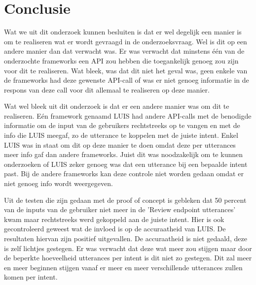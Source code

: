
\chapter{Conclusie}
\label{ch:conclusie}


Wat we uit dit onderzoek kunnen besluiten is dat er wel degelijk een manier is om te realiseren wat er wordt gevraagd in de onderzoeksvraag. Wel is dit op een andere manier dan dat verwacht was. Er was verwacht dat minstens één van de onderzochte frameworks een API zou hebben die toegankelijk genoeg zou zijn voor dit te realiseren. Wat bleek, was dat dit niet het geval was, geen enkele van de frameworks had deze gewenste API-call of was er niet genoeg informatie in de respons van deze call voor dit allemaal te realiseren op deze manier.

Wat wel bleek uit dit onderzoek is dat er een andere manier was om dit te realiseren. Eén framework genaamd LUIS had andere API-calls met de benodigde informatie om de input van de gebruikers rechtstreeks op te vangen en met de info die LUIS meegaf, zo de utterance te koppelen met de juiste intent. Enkel LUIS was in staat om dit op deze manier te doen omdat deze per utterances meer info gaf dan andere frameworks. Juist dit was noodzakelijk om te kunnen onderzoeken of LUIS zeker genoeg was dat een utterance bij een bepaalde intent past. Bij de andere frameworks kan deze controle niet worden gedaan omdat er niet genoeg info wordt weergegeven.

Uit de testen die zijn gedaan met de proof of concept is gebleken dat 50 percent van de inputs van de gebruiker niet meer in de 'Review endpoint utterances' kwam maar rechtstreeks werd gekoppeld aan de juiste intent. Hier is ook gecontroleerd geweest wat de invloed is op de accuraatheid van LUIS. De resultaten hiervan zijn positief uitgevallen. De accuraatheid is niet gedaald, deze is zelf lichtjes gestegen. Er was verwacht dat deze wat meer zou stijgen maar door de beperkte hoeveelheid utterances per intent is dit niet zo gestegen. Dit zal meer en meer beginnen stijgen vanaf er meer en meer verschillende utterances zullen komen per intent.

